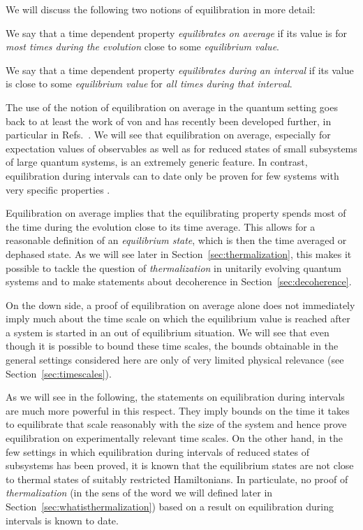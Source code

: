 \documentclass[a4paper,12pt,listof=totoc,index=totoc,bibliography=totoc,headsepline=false,headings=normal,BCOR16.153846mm,DIV12,headinclude,twoside,cleardoublepage=empty,numbers=noenddot,final]{scrreprt}
\theoremstyle{mystyle}
\numberwithin{equation}{section}
\numberwithin{figure}{section}
\numberwithin{lemma}{section}
\numberwithin{theorem}{section}
\numberwithin{corollary}{section}
\numberwithin{definition}{section}
\numberwithin{conjecture}{section}
\numberwithin{observation}{section}
\newcommand{\+}{\mkern2mu}
\DeclareMathOperator{\1}{\mathds{1}}
\begin{document}
We will discuss the following two notions of equilibration in more detail:
\begin{description}[font=\normalfont\itshape]
\item[Equilibration on average:]
  We say that a time dependent property \emph{equilibrates on average} if its value is for \emph{most times during the evolution} close to some \emph{equilibrium value}.
\item[Equilibration during intervals:]
We say that a time dependent property \emph{equilibrates during an interval} if its value is close to some \emph{equilibrium value} for \emph{all times during that interval}.
\end{description}

The use of the notion of equilibration on average in the quantum setting goes back to at least the work of von \textcite{vonneumann1929} and has recently been developed further, in particular in Refs.~\cite{tasaki98,Reimann08,Linden09,1110.5759v1,1012.4622v1,Reimann2012,Reimann12}.
We will see that equilibration on average, especially for expectation values of observables as well as for reduced states of small subsystems of large quantum systems, is an extremely generic feature.
In contrast, equilibration during intervals can to date only be proven for few systems with very specific properties \cite{cramer10_1,PhysRevLett.10-5}.

Equilibration on average implies that the equilibrating property spends most of the time during the evolution close to its time average.
This allows for a reasonable definition of an \emph{equilibrium state}, which is then the time averaged or dephased state.
As we will see later in Section~\ref{sec:thermalization}, this makes it possible to tackle the question of \emph{thermalization} in unitarily evolving quantum systems and to make statements about decoherence in Section~\ref{sec:decoherence}.

On the down side, a proof of equilibration on average alone does not immediately imply much about the time scale on which the equilibrium value is reached after a system is started in an out of equilibrium situation.
We will see that even though it is possible to bound these time scales, the bounds obtainable in the general settings considered here are only of very limited physical relevance (see Section~\ref{sec:timescales}).

As we will see in the following, the statements on equilibration during intervals are much more powerful in this respect.
They imply bounds on the time it takes to equilibrate that scale reasonably with the size of the system and hence prove equilibration on experimentally relevant time scales.
On the other hand, in the few settings in which equilibration during intervals of reduced states of subsystems has been proved, it is known that the equilibrium states are not close to thermal states of suitably restricted Hamiltonians.
In particulate, no proof of \emph{thermalization} (in the sens of the word we will defined later in Section~\ref{sec:whatisthermalization}) based on a result on equilibration during intervals is known to date.
\end{document}
